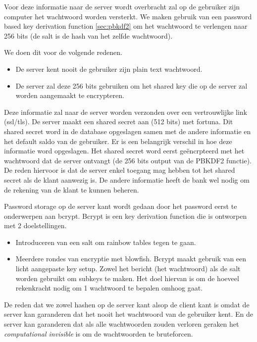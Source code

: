 \documentclass[11pt]{article}
\begin{document}
Voor deze informatie naar de server wordt overbracht zal op de gebruiker zijn computer het wachtwoord worden versterkt. We maken gebruik van een password based key derivation function \ref{sec:pbkdf2} om het wachtwoord te verlengen naar 256 bits (de salt is de hash van het zelfde wachtwoord). 

We doen dit voor de volgende redenen.
\begin{itemize}
\item De server kent nooit de gebruiker zijn plain text wachtwoord. 
\item De server zal deze 256 bits gebruiken om het shared key die op de server zal worden aangemaakt te encrypteren.
\end{itemize}

Deze informatie zal naar de server worden verzonden over een vertrouwlijke link (ssl/tls). 
De server maakt een shared secret aan (512 bits) met fortuna. Dit shared secret word in de database opgeslagen samen met de andere informatie en het default saldo van de gebruiker. Er is een belangrijk verschil in hoe deze informatie word opgeslagen. Het shared secret word eerst ge\"encrpteerd met het wachtwoord dat de server ontvangt (de 256 bits output van de PBKDF2 functie). De reden hiervoor is dat de server enkel toegang mag hebben tot het shared secret als de klant aanwezig is. De andere informatie heeft de bank wel nodig om de rekening van de klant te kunnen beheren.

Password storage op de server kant wordt gedaan door het password eerst te onderwerpen aan bcrypt. Bcrypt is een key derivation function die is ontworpen met 2 doelstellingen.
\begin{itemize}
\item Introduceren van een salt om rainbow tables tegen te gaan.
\item Meerdere rondes van encryptie met blowfish. Bcrypt maakt gebruik van een licht aangepaste key setup. Zowel het bericht (het wachtwoord) als de salt worden gebruikt om subkeys te maken. Het doel hiervan is om de hoeveel rekenkracht nodig om 1 wachtwoord te bepalen omhoog gaat. 
\end{itemize}
De reden dat we zowel hashen op de server kant alsop de client kant is omdat de server kan garanderen dat het nooit het wachtwoord van de gebruiker kent. En de server kan garanderen dat als alle wachtwoorden zouden verloren geraken het \emph{computational invisible} is om de wachtwoorden te bruteforcen.\\
\end{document}
